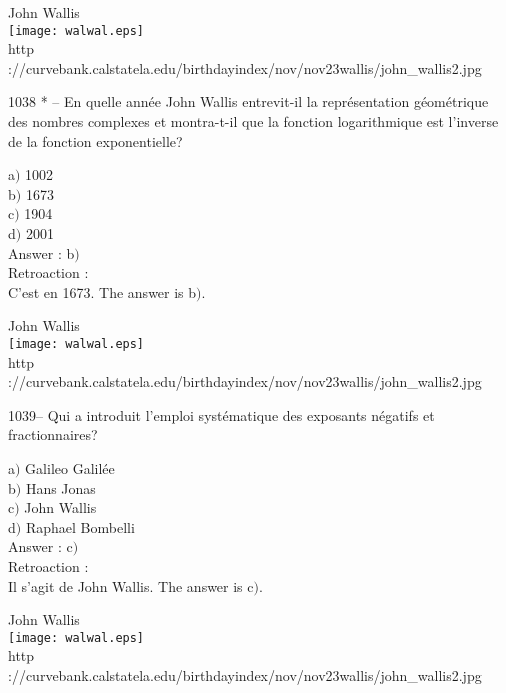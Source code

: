 ﻿\documentclass[letterpaper, 12pt]{article}
\begin{document}
        \begin{center}
        John Wallis\\
    \texttt{[image: walwal.eps]}\\
        {\footnotesize http
://curvebank.calstatela.edu/birthdayindex/nov/nov23wallis/john\_wallis2.jpg}
    \end{center}

1038 * -- En quelle ann\'ee John Wallis entrevit-il la
repr\'esentation g\'eom\'etrique des nombres complexes et
montra-t-il que la fonction logarithmique est l'inverse de la
fonction exponentielle?

a$)$ 1002 \\
b$)$ 1673  \\
c$)$ 1904  \\
d$)$ 2001 \\

Answer : b$)$\\

Retroaction :\\
C'est en 1673.
The answer is b$)$.\\

        \begin{center}
        John Wallis\\
    \texttt{[image: walwal.eps]}\\
        {\footnotesize http
://curvebank.calstatela.edu/birthdayindex/nov/nov23wallis/john\_wallis2.jpg}
    \end{center}

1039-- Qui a introduit l'emploi syst\'ematique des exposants
n\'egatifs et fractionnaires?

a$)$ Galileo Galil\'ee \\
b$)$ Hans Jonas  \\
c$)$ John Wallis  \\
d$)$ Raphael Bombelli \\

Answer : c$)$\\

Retroaction :\\
Il s'agit de John Wallis.
The answer is c$)$.\\

        \begin{center}
        John Wallis\\
    \texttt{[image: walwal.eps]}\\
        {\footnotesize http
://curvebank.calstatela.edu/birthdayindex/nov/nov23wallis/john\_wallis2.jpg}
    \end{center}
\end{document}
